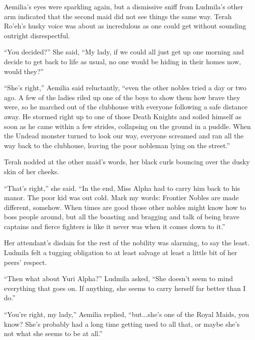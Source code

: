  

Aemilia’s eyes were sparkling again, but a dismissive sniff from Ludmila’s other arm indicated that the second maid did not see things the same way. Terah Ro'eh’s husky voice was about as incredulous as one could get without sounding outright disrespectful.

 

“You decided?” She said, “My lady, if we could all just get up one morning and decide to get back to life as usual, no one would be hiding in their homes now, would they?”

 

“She’s right,” Aemilia said reluctantly, “even the other nobles tried a day or two ago. A few of the ladies riled up one of the boys to show them how brave they were, so he marched out of the clubhouse with everyone following a safe distance away. He stormed right up to one of those Death Knights and soiled himself as soon as he came within a few strides, collapsing on the ground in a puddle. When the Undead monster turned to look our way, everyone screamed and ran all the way back to the clubhouse, leaving the poor nobleman lying on the street.”

 

Terah nodded at the other maid’s words, her black curls bouncing over the dusky skin of her cheeks.

 

“That’s right,” she said. “In the end, Miss Alpha had to carry him back to his manor. The poor kid was out cold. Mark my words: Frontier Nobles are made different, somehow. When times are good those other nobles might know how to boss people around, but all the boasting and bragging and talk of being brave captains and fierce fighters is like it never was when it comes down to it.”

 

Her attendant’s disdain for the rest of the nobility was alarming, to say the least. Ludmila felt a tugging obligation to at least salvage at least a little bit of her peers’ respect.

 

“Then what about Yuri Alpha?” Ludmila asked, “She doesn’t seem to mind everything that goes on. If anything, she seems to carry herself far better than I do.”

 

“You’re right, my lady,” Aemilia replied, “but...she’s one of the Royal Maids, you know? She’s probably had a long time getting used to all that, or maybe she’s not what she seems to be at all.”

